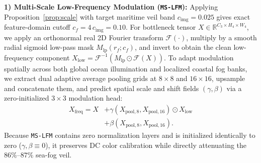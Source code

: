 \documentclass[journal,twoside]{IEEEtran}
\begin{document}
\textbf{1) Multi-Scale Low-Frequency Modulation (\texttt{MS-LFM}):} Applying Proposition~\ref{prop:scale} with target maritime veil band $c_{\mathrm{img}} = 0.025$ gives exact feature-domain cutoff $c_f = 4\,c_{\mathrm{img}} = 0.10$. For bottleneck tensor $X\in\mathbb{R}^{C_3\times H_4\times W_4}$, we apply an orthonormal real 2D Fourier transform $\mathcal{F}(\cdot)$, multiply by a smooth radial sigmoid low-pass mask $M_{\mathrm{lp}}(r_f; c_f)$, and invert to obtain the clean low-frequency component $X_{\mathrm{low}} = \mathcal{F}^{-1}(M_{\mathrm{lp}} \odot \mathcal{F}(X))$. To adapt modulation spatially across both global ocean illumination and localized coastal fog banks, we extract dual adaptive average pooling grids at $8\times 8$ and $16\times 16$, upsample and concatenate them, and predict spatial scale and shift fields $(\gamma, \beta)$ via a zero-initialized $3\times 3$ modulation head:
\begin{equation}
\begin{aligned}
X_{\mathrm{freq}} = X &+ \gamma(X_{\mathrm{pool},8}, X_{\mathrm{pool},16}) \odot X_{\mathrm{low}} \\
                      &+ \beta(X_{\mathrm{pool},8}, X_{\mathrm{pool},16}).
\end{aligned}
\label{eq:mslfm}
\end{equation}
Because \texttt{MS-LFM} contains zero normalization layers and is initialized identically to zero ($\gamma,\beta \equiv 0$), it preserves DC color calibration while directly attenuating the $86\%\text{--}87\%$ sea-fog veil.
\end{document}
